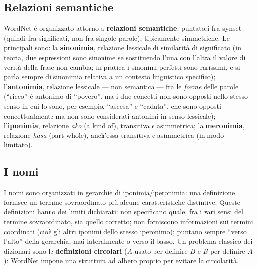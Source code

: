\documentclass[11pt,a4paper]{report}
\begin{document}
\subsection{Relazioni semantiche}

WordNet è organizzato attorno a \textbf{relazioni semantiche}: puntatori fra synset (quindi fra significati, non fra singole parole), tipicamente simmetriche. Le principali sono: la \textbf{sinonimia}, relazione lessicale di similarità di significato (in teoria, due espressioni sono sinonime se sostituendo l'una con l'altra il valore di verità della frase non cambia; in pratica i sinonimi perfetti sono rarissimi, e si parla sempre di sinonimia relativa a un contesto linguistico specifico); l'\textbf{antonimia}, relazione lessicale --- non semantica --- fra le \emph{forme} delle parole (``ricco'' è antonimo di ``povero'', ma i due concetti non sono opposti nello stesso senso in cui lo sono, per esempio, ``ascesa'' e ``caduta'', che sono opposti concettualmente ma non sono considerati antonimi in senso lessicale); l'\textbf{iponimia}, relazione \emph{ako} (a kind of), transitiva e asimmetrica; la \textbf{meronimia}, relazione \emph{hasa} (part-whole), anch'essa transitiva e asimmetrica (in modo limitato).

\subsection{I nomi}

I nomi sono organizzati in gerarchie di iponimia/iperonimia: una definizione fornisce un termine sovraordinato più alcune caratteristiche distintive. Queste definizioni hanno dei limiti dichiarati: non specificano quale, fra i vari sensi del termine sovraordinato, sia quello corretto; non forniscono informazioni sui termini coordinati (cioè gli altri iponimi dello stesso iperonimo); puntano sempre ``verso l'alto'' della gerarchia, mai lateralmente o verso il basso. Un problema classico dei dizionari sono le \textbf{definizioni circolari} ($A$ usato per definire $B$ e $B$ per definire $A$): WordNet impone una struttura ad albero proprio per evitare la circolarità.
\end{document}
